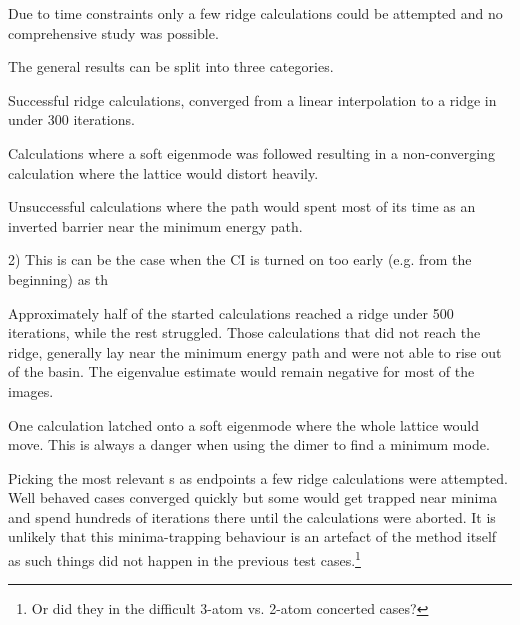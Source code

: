 Due to time constraints only a few ridge calculations could be attempted and no comprehensive study was possible.
\expand

The general results can be split into three categories.
\bit
\item Successful ridge calculations, converged from a linear interpolation to a ridge in under 300 iterations.
\item Calculations where a soft eigenmode was followed resulting in a non-converging calculation where the lattice would distort heavily.
\item Unsuccessful calculations where the path would spent most of its time as an inverted barrier near the minimum energy path.
\eit

2) This is can be the case when the CI is turned on too early (e.g. from the beginning) as th

Approximately half of the started calculations reached a ridge under 500 iterations, while the rest struggled.
Those calculations that did not reach the ridge, generally lay near the minimum energy path and were not able to rise out of the basin.
The eigenvalue estimate would remain negative for most of the images.

One calculation latched onto a soft eigenmode where the whole lattice would move.
This is always a danger when using the dimer to find a minimum mode.

Picking the most relevant s as endpoints a few ridge calculations were attempted.
Well behaved cases converged quickly but some would get trapped near minima and spend hundreds of iterations there until the calculations were aborted.
It is unlikely that this minima-trapping behaviour is an artefact of the method itself as such things did not happen in the previous test cases.\footnote{Or did they in the difficult 3-atom vs. 2-atom concerted cases?}



